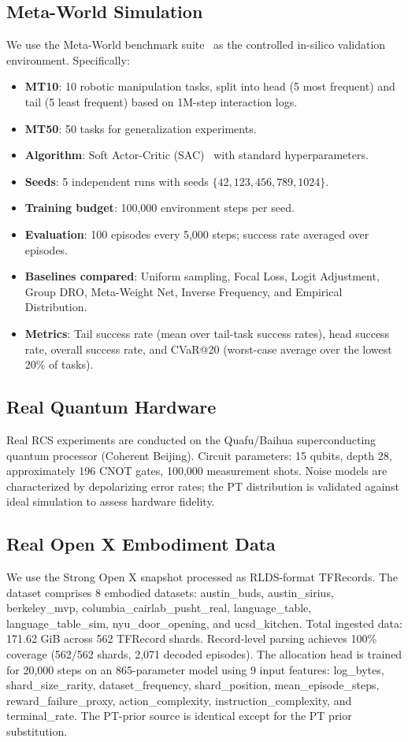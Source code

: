 \documentclass[10pt]{article}
\begin{document}
\subsection{Meta-World Simulation}
We use the Meta-World benchmark suite~\citep{yu2020metaworld} as the controlled
in-silico validation environment.  Specifically:

\begin{itemize}
  \item \textbf{MT10}: 10 robotic manipulation tasks, split into head (5 most frequent)
    and tail (5 least frequent) based on 1M-step interaction logs.
  \item \textbf{MT50}: 50 tasks for generalization experiments.
  \item \textbf{Algorithm}: Soft Actor-Critic (SAC)~\citep{haarnoja2018soft} with
    standard hyperparameters.
  \item \textbf{Seeds}: 5 independent runs with seeds $\{42, 123, 456, 789, 1024\}$.
  \item \textbf{Training budget}: 100,000 environment steps per seed.
  \item \textbf{Evaluation}: 100 episodes every 5,000 steps; success rate averaged
    over episodes.
  \item \textbf{Baselines compared}: Uniform sampling, Focal Loss, Logit Adjustment,
    Group DRO, Meta-Weight Net, Inverse Frequency, and Empirical Distribution.
  \item \textbf{Metrics}: Tail success rate (mean over tail-task success rates),
    head success rate, overall success rate, and CVaR@20 (worst-case average over
    the lowest 20\% of tasks).
\end{itemize}

\subsection{Real Quantum Hardware}
Real RCS experiments are conducted on the Quafu/Baihua superconducting quantum
processor (Coherent Beijing).  Circuit parameters: 15 qubits, depth 28,
approximately 196 CNOT gates, 100,000 measurement shots.  Noise models are
characterized by depolarizing error rates; the PT distribution is validated
against ideal simulation to assess hardware fidelity.

\subsection{Real Open X Embodiment Data}
We use the Strong Open X snapshot processed as RLDS-format TFRecords.  The dataset
comprises 8 embodied datasets: austin\_buds, austin\_sirius, berkeley\_mvp,
columbia\_cairlab\_pusht\_real, language\_table, language\_table\_sim, nyu\_door\_opening,
and ucsd\_kitchen.  Total ingested data: 171.62 GiB across 562 TFRecord shards.
Record-level parsing achieves 100\% coverage (562/562 shards, 2,071 decoded episodes).
The allocation head is trained for 20,000 steps on an 865-parameter model using
9 input features: log\_bytes, shard\_size\_rarity, dataset\_frequency, shard\_position,
mean\_episode\_steps, reward\_failure\_proxy, action\_complexity, instruction\_complexity,
and terminal\_rate.  The PT-prior source is identical except for the PT prior substitution.
\end{document}
